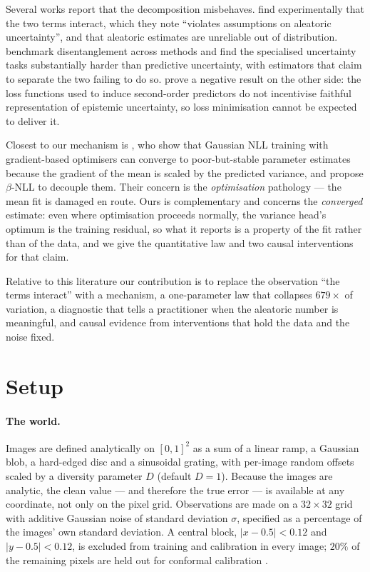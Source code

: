 \documentclass[10pt]{article}
\begin{document}
Several works report that the decomposition misbehaves. \citet{valdenegro2022} find
experimentally that the two terms interact, which they note ``violates assumptions on
aleatoric uncertainty'', and that aleatoric estimates are unreliable out of distribution.
\citet{mucsanyi2024} benchmark disentanglement across methods and find the specialised
uncertainty tasks substantially harder than predictive uncertainty, with estimators that
claim to separate the two failing to do so. \citet{bengs2022} prove a negative result on the
other side: the loss functions used to induce second-order predictors do not incentivise
faithful representation of epistemic uncertainty, so loss minimisation cannot be expected to
deliver it.

Closest to our mechanism is \citet{seitzer2022}, who show that Gaussian NLL training with
gradient-based optimisers can converge to poor-but-stable parameter estimates because the
gradient of the mean is scaled by the predicted variance, and propose $\beta$-NLL to
decouple them. Their concern is the \emph{optimisation} pathology --- the mean fit is damaged
en route. Ours is complementary and concerns the \emph{converged} estimate: even where
optimisation proceeds normally, the variance head's optimum is the training residual, so what
it reports is a property of the fit rather than of the data, and we give the quantitative law
and two causal interventions for that claim.

Relative to this literature our contribution is to replace the observation ``the terms
interact'' with a mechanism, a one-parameter law that collapses $679\times$ of variation, a
diagnostic that tells a practitioner when the aleatoric number is meaningful, and causal
evidence from interventions that hold the data and the noise fixed.

\section{Setup}
\label{sec:setup}

\paragraph{The world.} Images are defined analytically on $[0,1]^2$ as a sum of a linear
ramp, a Gaussian blob, a hard-edged disc and a sinusoidal grating, with per-image random
offsets scaled by a diversity parameter $D$ (default $D=1$). Because the images are
analytic, the clean value --- and therefore the true error --- is available at any
coordinate, not only on the pixel grid. Observations are made on a $32\times32$ grid with
additive Gaussian noise of standard deviation $\sigma$, specified as a percentage of the
images' own standard deviation. A central block, $|x-0.5|<0.12$ and $|y-0.5|<0.12$, is
excluded from training and calibration in every image; $20\%$ of the remaining pixels are
held out for conformal calibration \citep{vovk2005, angelopoulos2021}.
\end{document}
